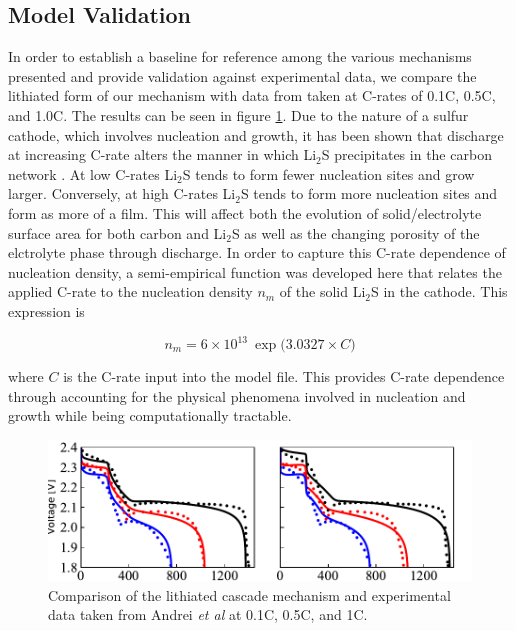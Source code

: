\documentclass{elsarticle}
\begin{document}
\subsection{Model Validation}
In order to establish a baseline for reference among the various mechanisms presented  and provide validation against experimental data, we compare the lithiated form of our mechanism with data from \cite{ANDREI2018469} taken at C-rates of 0.1C, 0.5C, and 1.0C. The results can be seen in figure \ref{fig:lithiatedcascadevalidation}. Due to the nature of a sulfur cathode, which involves nucleation and growth, it has been shown that discharge at increasing C-rate alters the manner in which Li$_2$S precipitates in the carbon network \cite{REN2016115}. At low C-rates Li$_2$S tends to form fewer nucleation sites and grow larger. Conversely, at high C-rates Li$_2$S tends to form more nucleation sites and form as more of a film. This will affect both the evolution of solid/electrolyte surface area for both carbon and Li$_2$S as well as the changing porosity of the elctrolyte phase through discharge. In order to capture this C-rate dependence of nucleation density, a semi-empirical function was developed here that relates the applied C-rate to the nucleation density $n_m$ of the solid Li$_2$S in the cathode. This expression is 

\begin{equation}
    n_m = 6 \times 10^{13} ~ \exp \big( 3.0327\times C \big)
\end{equation}

where $C$ is the C-rate input into the model file. This provides C-rate dependence through accounting for the physical phenomena involved in nucleation and growth while being computationally tractable.

\begin{center}
\begin{figure}
    \centering
    \includegraphics[width=\textwidth]{Figures/Vcell_Andrei_data.pdf}
    \caption{Comparison of the lithiated cascade mechanism and experimental data taken from Andrei \textit{et al} \cite{ANDREI2018469} at 0.1C, 0.5C, and 1C.}
    \label{fig:lithiatedcascadevalidation}
\end{figure}
\end{center}
\end{document}
